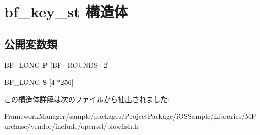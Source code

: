 \hypertarget{structbf__key__st}{}\section{bf\+\_\+key\+\_\+st 構造体}
\label{structbf__key__st}
\subsection*{公開変数類}
\begin{DoxyCompactItemize}
\item 
\hypertarget{structbf__key__st_ab3d902f934c73304feaa3989267dd49e}{}B\+F\+\_\+\+L\+O\+N\+G {\bfseries P} \mbox{[}B\+F\+\_\+\+R\+O\+U\+N\+D\+S+2\mbox{]}\label{structbf__key__st_ab3d902f934c73304feaa3989267dd49e}

\item 
\hypertarget{structbf__key__st_ace6847124ec6775c49ea44b13598f8a9}{}B\+F\+\_\+\+L\+O\+N\+G {\bfseries S} \mbox{[}4 $\ast$256\mbox{]}\label{structbf__key__st_ace6847124ec6775c49ea44b13598f8a9}

\end{DoxyCompactItemize}


この構造体詳解は次のファイルから抽出されました\+:\begin{DoxyCompactItemize}
\item 
Framework\+Manager/sample/packages/\+Project\+Package/i\+O\+S\+Sample/\+Libraries/\+M\+Purchase/vendor/include/openssl/blowfish.\+h\end{DoxyCompactItemize}
